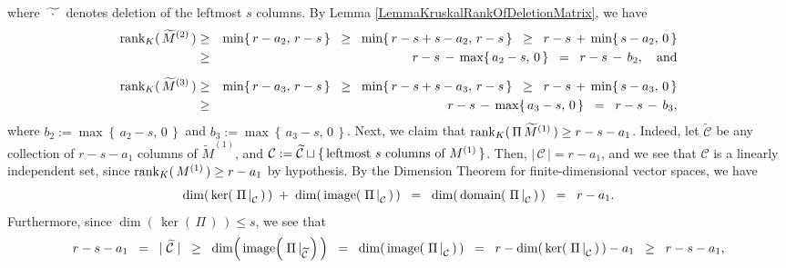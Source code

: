 where $\widetilde{{\color{white}\cdot}\cdot{\color{white}\cdot}}$ denotes deletion of the leftmost $s$ columns.
By Lemma \ref{LemmaKruskalRankOfDeletionMatrix}, we have
\begin{eqnarray*}
\rank_{K}(\,\widetilde{M}^{(2)}\,)
& \geq & \min\!\left\{\,r-a_{2},\,r-s\,\right\}
\;\;\geq\;\; \min\!\left\{\,r-s+s-a_{2},\,r-s\,\right\}
\;\;\geq\;\; r-s\,+\,\min\!\left\{\,s-a_{2},\,0\,\right\}
\\
&\geq& r-s\,-\,\max\!\left\{\,a_{2}-s,\,0\,\right\}
\;\; = \;\; r-s \,-\, b_{2},
\quad\textnormal{and}
\\
\rank_{K}(\,\widetilde{M}^{(3)}\,)
& \overset{{\color{white}\vert}}{\geq} & \min\!\left\{\,r-a_{3},\,r-s\,\right\}
\;\;\geq\;\; \min\!\left\{\,r-s+s-a_{3},\,r-s\,\right\}
\;\;\geq\;\; r-s \,+\, \min\!\left\{\,s-a_{3},\,0\,\right\}
\\
&\geq& r-s\,-\,\max\!\left\{\,a_{3}-s,\,0\,\right\}
\;\; = \;\; r-s \,-\, b_{3},
\end{eqnarray*}
where $b_{2} := \max\!\left\{\,a_{2}-s,\,0\,\right\}$ and $b_{3} := \max\!\left\{\,a_{3}-s,\,0\,\right\}$.
Next, we claim that $\textnormal{rank}_{K}(\,\Pi\,\widetilde{M}^{(1)}\,) \geq r - s - a_{1}$.
Indeed, let $\widetilde{\mathcal{C}}$ be any collection of $r - s - a_{1}$ columns of $\widetilde{M}^{(1)}$,
and $\mathcal{C} := \widetilde{\mathcal{C}} \sqcup \{\,\textnormal{leftmost $s$ columns of $M^{(1)}$}\,\}$.
Then, $\left\vert\,\mathcal{C}\,\right\vert = r - a_{1}$, and we see that $\mathcal{C}$ is a linearly independent
set, since $\textnormal{rank}_{K}(\,M^{(1)}\,) \geq r - a_{1}$ by hypothesis.
By the Dimension Theorem for finite-dimensional vector spaces, we have
\begin{equation*}
\dim\!\left(\,\ker\!\left(\,\left.\Pi\,\right\vert_{\mathcal{C}}\,\right)\,\right)
\; + \;
\dim\!\left(\,\textnormal{image}\!\left(\,\left.\Pi\,\right\vert_{\mathcal{C}}\,\right)\,\right)
\;\; = \;\;
\dim\!\left(\,\textnormal{domain}\!\left(\,\left.\Pi\,\right\vert_{\mathcal{C}}\,\right)\,\right)
\;\; = \;\; r - a_{1}.
\end{equation*}
Furthermore, since $\dim\!\left(\,\ker\!\left(\,\Pi\,\right)\,\right) \leq s$, we see that
\begin{equation*}
r - s - a_{1}
\;\; = \;\; \vert\;\widetilde{\mathcal{C}}\;\vert
\;\; \geq \;\; \dim\!\left(\,\textnormal{image}\!\left(\,\left.\Pi\,\right\vert_{\widetilde{\mathcal{C}}}\,\right)\,\right)
\;\; = \;\; \dim\!\left(\,\textnormal{image}\!\left(\,\left.\Pi\,\right\vert_{\mathcal{C}}\,\right)\,\right)
\;\; = \;\; r - \dim\!\left(\,\ker\!\left(\,\left.\Pi\,\right\vert_{\mathcal{C}}\,\right)\,\right) - a_{1}
\;\; \geq \;\; r - s - a_{1},
\end{equation*}
